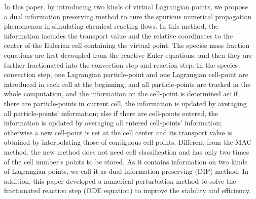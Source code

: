 \documentclass[review]{elsarticle}
\theoremstyle{plain}\newtheorem{definition}{\sc{Definition}}
\theoremstyle{defination}\newtheorem{example}{Example}[section]
\numberwithin{equation}{section}
\numberwithin{table}{section}
\begin{document}
{In this paper, by introducing two kinds of virtual Lagrangian points, we propose a dual information preserving method to cure the spurious numerical propagation phenomenon in simulating chemical reacting flows. In this method, the information includes the transport value and the relative coordinates to the center of the Eulerian cell containing the virtual point. 
The species mass fraction equations are first decoupled from the reactive Euler equations, and then they are further fractionated into the convection step and reaction step. In the species convection step,  
one Lagrangian particle-point and  one Lagrangian cell-point are introduced in each cell at the beginning, and all particle-points are tracked in the whole computation, and the information on the  cell-point is determined as: if there are particle-points in current cell, the information is updated by averaging all particle-points' information; else if there are cell-points entered, the information is updated by averaging all entered cell-points' information; otherwise a new cell-point is set at the cell center and its transport value is obtained by interpolating those of contiguous cell-points.
				  Different from the MAC method, the new method does not need cell classification and has only two times of the cell number's points to be stored. As it contains information on two kinds of Lagrangian points, we call it as dual information preserving (DIP) method.
In addition, this paper developed
a numerical perturbation method to solve the fractionated reaction step (ODE equation) to improve the stability and efficiency.

}
\end{document}
